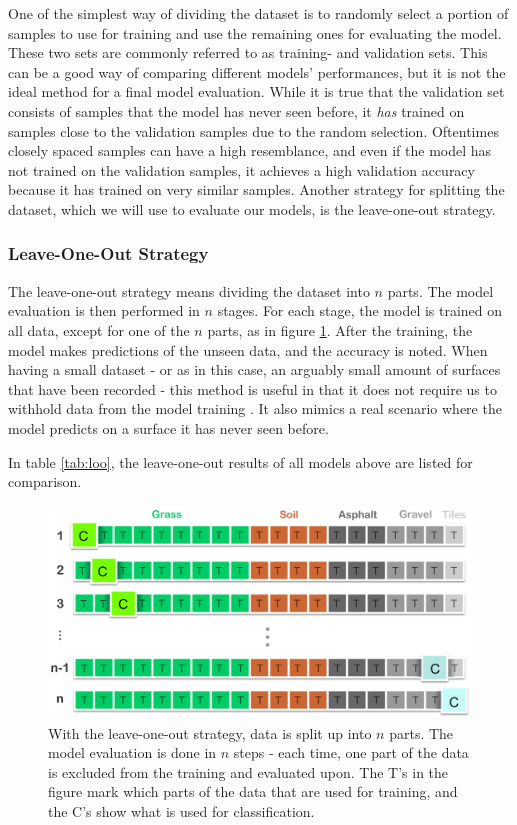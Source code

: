 One of the simplest way of dividing the dataset is to randomly select a portion of samples to use for training and use the remaining ones for evaluating the model. These two sets are commonly referred to as training- and validation sets. This can be a good way of comparing different models' performances, but it is not the ideal method for a final model evaluation. While it is true that the validation set consists of samples that the model has never seen before, it \textit{has} trained on samples close to the validation samples due to the random selection. Oftentimes closely spaced samples can have a high resemblance, and even if the model has not trained on the validation samples, it achieves a high validation accuracy because it has trained on very similar samples. Another strategy for splitting the dataset, which we will use to evaluate our models, is the leave-one-out strategy.


\subsubsection{Leave-One-Out Strategy}
The leave-one-out strategy means dividing the dataset into $n$ parts. The model evaluation is then performed in $n$ stages. For each stage, the model is trained on all data, except for one of the $n$ parts, as in figure \ref{fig:loo}. After the training, the model makes predictions of the unseen data, and the accuracy is noted. When having a small dataset - or as in this case, an arguably small amount of surfaces that have been recorded - this method is useful in that it does not require us to withhold data from the model training \citep{raschka}. It also mimics a real scenario where the model predicts on a surface it has never seen before.

In table \ref{tab:loo}, the leave-one-out results of all models above are listed for comparison.

\begin{figure}[h]
	\label{fig:loo}
	\centering
	\includegraphics[scale=0.3]{figs_temp/loo.jpg}
	\caption{With the leave-one-out strategy, data is split up into $n$ parts. The model evaluation is done in $n$ steps - each time, one part of the data is excluded from the training and evaluated upon. The T's in the figure mark which parts of the data that are used for training, and the C's show what is used for classification.}
\end{figure}

